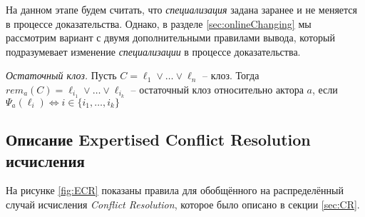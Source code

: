 На данном этапе будем считать, что \emph{специализация} задана заранее и не меняется в процессе доказательства. Однако, в разделе \ref{sec:onlineChanging} мы рассмотрим вариант с двумя дополнительными правилами вывода, который подразумевает изменение \emph{специализации} в процессе доказательства.

\begin{definition}
	\emph{Остаточный клоз.} Пусть $C = \ell_1 \vee \ldots \vee \ell_n$ -- клоз. Тогда $rem_a(C) = \ell_{i_1} \vee \ldots \vee \ell_{i_k}$ -- остаточный клоз относительно актора $a$, если $\Psi_a(\ell_i) \iff i \in \{i_1, \ldots, i_k\}$
\end{definition}


\subsection{Описание Expertised Conflict Resolution исчисления}

На рисунке \ref{fig:ECR} показаны правила для обобщённого на распределённый случай исчисления \emph{Conflict Resolution}, которое было описано в секции \ref{sec:CR}. \par


